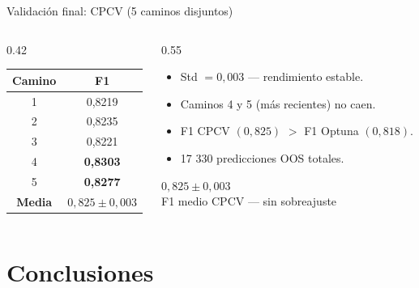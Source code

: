 \documentclass[aspectratio=169, spanish, 12pt]{beamer}
\newcommand{\kpi}[3]{%
  \begin{tcolorbox}[kpibox=#1, halign=center]
    {\Large\color{#1}#2}\\[1pt]
    {\small\color{#1!70}#3}
  \end{tcolorbox}%
}
\begin{document}
\begin{frame}{Validación final: CPCV (5 caminos disjuntos)}
  \begin{columns}[T]
    \begin{column}{0.42\textwidth}
      \large
      \begin{tabular}{cc}
        \toprule
        \textbf{Camino} & \textbf{F1} \\
        \midrule
        1 & 0,8219 \\
        2 & 0,8235 \\
        3 & 0,8221 \\
        \rowcolor{coltrans!25!black} 4 & \textbf{0,8303} \\
        \rowcolor{coltrans!25!black} 5 & \textbf{0,8277} \\
        \midrule
        \textbf{Media} & $0{,}825 \pm 0{,}003$ \\
        \bottomrule
      \end{tabular}
    \end{column}
    \begin{column}{0.55\textwidth}
      \begin{itemize}
        \item[\faCheckCircle] Std $= 0{,}003$ — rendimiento estable.
        \item[\faCheckCircle] Caminos 4 y 5 (más recientes) no caen.
        \item[\faCheckCircle] F1 CPCV $(0{,}825)$ $>$ F1 Optuna $(0{,}818)$.
        \item[\faCheckCircle] 17 330 predicciones OOS totales.
      \end{itemize}
      \vspace{0.3em}
      \kpi{coltrans}{$0{,}825 \pm 0{,}003$}{F1 medio CPCV — sin sobreajuste}
    \end{column}
  \end{columns}
\end{frame}

\section{Conclusiones}  %
\end{document}
